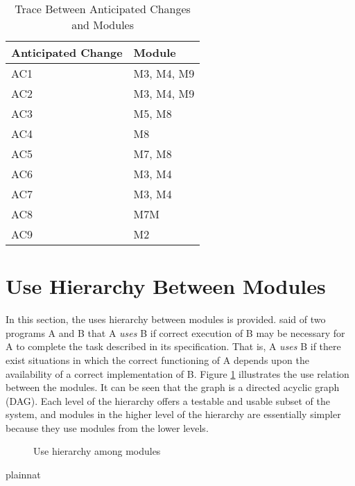 \documentclass[12pt, titlepage]{article}
\begin{document}
\begin{table}[H]
  \centering
  \begin{tabular}{p{} p{}}
  \toprule
  \textbf{Anticipated Change} & \textbf{Module}\\
  \midrule
  AC1 & M3, M4, M9\\
  AC2 & M3, M4, M9\\
  AC3 & M5, M8\\
  AC4 & M8\\
  AC5 & M7, M8\\
  AC6 & M3, M4\\
  AC7 & M3, M4\\
  AC8 & M7M\\
  AC9 & M2\\
  \bottomrule
  \end{tabular}
  \caption{Trace Between Anticipated Changes and Modules}
  \label{TblACM}
  \end{table}

\section{Use Hierarchy Between Modules} \label{SecUse}

In this section, the uses hierarchy between modules is
provided. \citet{Parnas1978} said of two programs A and B that A {\em uses} B if
correct execution of B may be necessary for A to complete the task described in
its specification. That is, A {\em uses} B if there exist situations in which
the correct functioning of A depends upon the availability of a correct
implementation of B.  Figure \ref{FigUH} illustrates the use relation between
the modules. It can be seen that the graph is a directed acyclic graph
(DAG). Each level of the hierarchy offers a testable and usable subset of the
system, and modules in the higher level of the hierarchy are essentially simpler
because they use modules from the lower levels.

\begin{figure}[H]
\centering
\caption{Use hierarchy among modules}
\label{FigUH}
\end{figure}


 {plainnat}


\newpage{}
\end{document}
